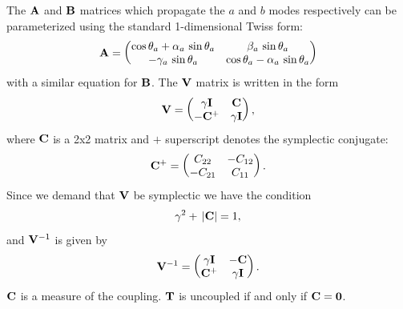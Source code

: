 The ${\bf A}$ and ${\bf B}$ matrices which propagate the $a$ and $b$ modes respectively can be
parameterized using the standard 1-dimensional Twiss form:
\begin{equation}
  {\bf A} = \begin{pmatrix}
    \cos\theta_a + \alpha_a \, \sin\theta_a & \beta_a \, \sin\theta_a \\
    -\gamma_a \, \sin\theta_a & \cos\theta_a - \alpha_a \, \sin\theta_a
    \end{pmatrix}
\end{equation}
with a similar equation for ${\bf B}$. The ${\bf V}$ matrix is written in the form
  \begin{equation}
    {\bf V} = 
    \begin{pmatrix}
        \gamma {\bf I} & {\bf C} \cr 
        -{\bf C}^+     & \gamma {\bf I} \cr
    \end{pmatrix}
    , \label{vgicc1}
  \end{equation}
where ${\bf C}$ is a 2x2 matrix and $+$ superscript 
denotes the symplectic conjugate:
  \begin{equation}
    {\bf C}^+ = 
    \begin{pmatrix}
       C_{22} & -C_{12} \cr 
      -C_{21} & C_{11} \cr
    \end{pmatrix}
    . \label{ccccc}
  \end{equation}
Since we demand that ${\bf V}$ be symplectic we have the condition
  \begin{equation}               
    \gamma^2 + \, |{\bf C}| = 1
    , \label{gc1}
  \end{equation}
and ${\bf V}^{-1}$ is given by
  \begin{equation}
    {\bf V}^{-1} = 
    \begin{pmatrix}
      \gamma {\bf I} & -{\bf C} \cr 
      {\bf C}^+ & \gamma {\bf I} \cr
    \end{pmatrix}
    . \label{vgicc2}
  \end{equation} 
${\bf C}$ is a measure of the coupling. ${\bf T}$ is uncoupled if and only if ${\bf C} = {\bf 0}$.

